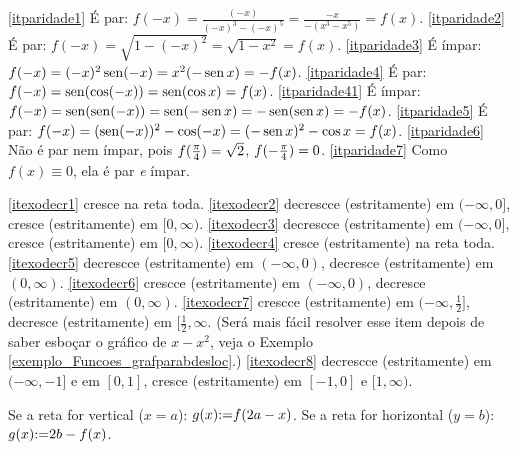 \begin{Solution}{2.6}
\eqref{itparidade1} É par: $f(-x)=\tfrac{(-x)}{(-x)^3-(-x)^5}=\tfrac{-x}{-(x^3-x^5)}=f(x)$.
\eqref{itparidade2} É par: $f(-x)=\sqrt{1-(-x)^2}=\sqrt{1-x^2}=f(x)$.
\eqref{itparidade3} É ímpar: $f(-x)=(-x)^2\operatorname{sen} (-x)=x^2(-\operatorname{sen} x)=-f(x)$.
\eqref{itparidade4} É par: $f(-x)=\operatorname{sen} (\cos(-x))=\operatorname{sen}(\cos x)=f(x)$.
\eqref{itparidade41} É ímpar: $f(-x)=\operatorname{sen} (\operatorname{sen}(-x))=\operatorname{sen}(-\operatorname{sen} x)=-\operatorname{sen}(\operatorname{sen} x)=-f(x)$.
\eqref{itparidade5} É par: $f(-x)=(\operatorname{sen}(-x))^2-\cos(-x)=(-\operatorname{sen} x)^2-\cos x=f(x)$.
 \eqref{itparidade6} Não é par nem ímpar, pois $f(\tfrac{\pi}{4})=\sqrt{2}$,
$f(-\tfrac{\pi}{4})=0$.
\eqref{itparidade7} Como $f(x)\equiv 0$, ela é par \emph{e} ímpar.
\end{Solution}
\begin{Solution}{2.7}
\eqref{itexodecr1} cresce na reta toda.
\eqref{itexodecr2} decrescce (estritamente) em $(-\infty,0]$, cresce (estritamente) em $[0,\infty)$.
\eqref{itexodecr3} decrescce (estritamente) em $(-\infty,0]$, cresce (estritamente) em $[0,\infty)$.
\eqref{itexodecr4}  cresce (estritamente) na reta toda.
\eqref{itexodecr5} decrescce (estritamente) em $(-\infty,0)$, decresce (estritamente) em $(0,\infty)$.
\eqref{itexodecr6} crescce (estritamente) em $(-\infty,0)$, decresce (estritamente) em $(0,\infty)$.
\eqref{itexodecr7} crescce (estritamente) em $(-\infty,\tfrac12]$, decresce (estritamente) em
$[\tfrac12,\infty$. (Será mais fácil resolver esse item depois de saber esboçar o gráfico de $x-x^2$,
veja o Exemplo \ref{exemplo_Funcoes_grafparabdesloc}.)
\eqref{itexodecr8} decrescce (estritamente) em $(-\infty,-1]$ e em $[0,1]$,
cresce (estritamente) em $[-1,0]$ e $[1,\infty)$.
\end{Solution}
\begin{Solution}{2.8}
Se a reta for vertical ($x=a$): $g(x){:=} f(2a-x)$.
Se a reta for horizontal ($y=b$): $g(x){:=} 2b-f(x)$.
\end{Solution}
